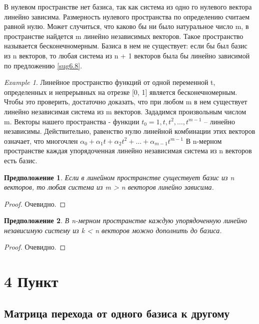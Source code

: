 \documentclass[11pt; a4paper]{report}
\theoremstyle{plain} %
\newtheorem{sug}{Предположение}[section]
\theoremstyle{defenition}
\theoremstyle{remark}
\newtheorem*{exmpl}{Example}
\begin{document}
В нулевом пространстве нет базиса, так как система из одно­ го нулевого вектора линейно зависима. 
Размерность нулевого прост­ранства по определению считаем равной нулю.
Может случиться, что каково бы ни было натуральное число m, в пространстве найдется m линейно
 независимых векторов. Такое пространство называется бесконечномерным. Базиса в нем не сущест­вует: 
 если бы был базис из n векторов, то любая система из n + 1 векторов была бы линейно зависимой по 
 предложению \ref{sug6.8}.
 \begin{exmpl}
 Линейное пространство функций от одной перемен­ной t, определенных и непрерывных на отрезке [0, 1] 
 является бес­конечномерным. Чтобы это проверить, достаточно доказать, что при любом m в нем существует 
 линейно независимая система из m век­торов. Зададимся произвольным числом m. Векторы нашего 
 прост­ранства - функции $t_0 = 1, t, t^2 ,\ldots, t^{m-1}$ -- линейно независимы. Действительно, 
 равенство нулю линейной комбинации этих векторов означает, что многочлен
$\alpha_0+ \alpha_1t+ \alpha_2t^2 +\ldots+\alpha_{m-1}t^{m-1}$
В n-мерном пространстве каждая упорядо­ченная линейно независимая система из n векторов есть базис.
\end{exmpl}

\begin{sug}\label{sug6.9}
Если в линейном пространстве существует базис из n векторов, то любая система из m > n векторов линейно
зависима.
\end{sug}
\begin{proof}
Очевидно.
\end{proof}

\begin{sug}\label{sug6.10}
В n-мерном пространстве каждую упорядоченную линейно независимую систему из k < n векторов можно 
до­полнить до базиса.
\end{sug}
\begin{proof}
Очевидно.
\end{proof}


\newpage
\section{4 Пункт}

\subsection{Матрица перехода от одного базиса к другому}
\end{document}

